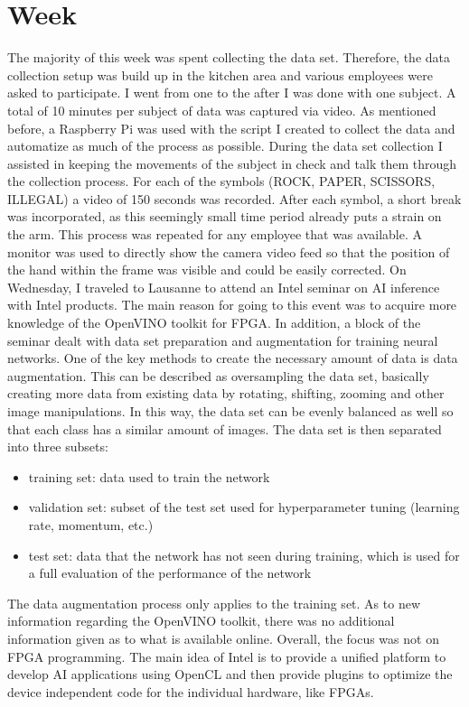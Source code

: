 \chapter{Week}
The majority of this week was spent collecting the data set. Therefore, the data collection setup was build up in the kitchen area and various employees were asked to participate. I went from one to the after I was done with one subject. A total of 10 minutes per subject of data was captured via video. As mentioned before, a Raspberry Pi was used with the script I created to collect the data and automatize as much of the process as possible. During the data set collection I assisted in keeping the movements of the subject in check and talk them through the collection process. For each of the symbols (ROCK, PAPER, SCISSORS, ILLEGAL) a video of 150 seconds was recorded. After each symbol, a short break was incorporated, as this seemingly small time period already puts a strain on the arm. This process was repeated for any employee that was available. A monitor was used to directly show the camera video feed so that the position of the hand within the frame was visible and could be easily corrected.
On Wednesday, I traveled to Lausanne to attend an Intel seminar on \ac{AI} inference with Intel products. The main reason for going to this event was to acquire more knowledge of the OpenVINO toolkit for \ac{FPGA}. In addition, a block of the seminar dealt with data set preparation and augmentation for training neural networks. One of the key methods to create the necessary amount of data is data augmentation. This can be described as oversampling the data set, basically creating more data from existing data by rotating, shifting, zooming and other image manipulations. In this way, the data set can be evenly balanced as well so that each class has a similar amount of images. The data set is then separated into three subsets:
\begin{itemize}
	\item training set: data used to train the network
	\item validation set: subset of the test set used for hyperparameter tuning (learning rate, momentum, etc.)
	\item test set: data that the network has not seen during training, which is used for a full evaluation of the performance of the network
\end{itemize}
The data augmentation process only applies to the training set. As to new information regarding the OpenVINO toolkit, there was no additional information given as to what is available online. Overall, the focus was not on \ac{FPGA} programming. The main idea of Intel is to provide a unified platform to develop \ac{AI} applications using OpenCL and then provide plugins to optimize the device independent code for the individual hardware, like \acp{FPGA}.
